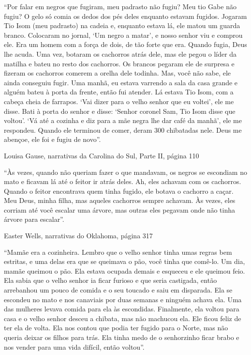 ``Por falar em negros que fugiram, meu padrasto não fugiu? Meu tio Gabe
não fugiu? O gelo só comia os dedos dos pés deles enquanto estavam
fugidos. Jogaram Tio Isom (meu padrasto) na cadeia e, enquanto estava
lá, ele matou um guarda branco. Colocaram no jornal, `Um negro a matar',
e nosso senhor viu e comprou ele. Era um homem com a força de dois, de
tão forte que era. Quando fugia, Deus lhe acuda. Uma vez, botaram os
cachorros atrás dele, mas ele pegou o líder da matilha e bateu no resto
dos cachorros. Os brancos pegaram ele de surpresa e fizeram os cachorros
comerem a orelha dele todinha. Mas, você não sabe, ele ainda conseguiu
fugir. Uma manhã, eu estava varrendo a sala da casa grande e alguém
bateu à porta da frente, então fui atender. Lá estava Tio Isom, com a
cabeça cheia de farrapos. `Vai dizer para o velho senhor que eu voltei',
ele me disse. Bati à porta do senhor e disse: `Senhor coronel Sam, Tio
Isom disse que voltou'. `Vá até a cozinha e diz para a mãe negra lhe dar
café da manhã', ele me respondeu. Quando ele terminou de comer, deram
300 chibatadas nele. Deus me abençoe, ele foi e fugiu de novo''.

Louisa Gause, narrativas da Carolina do Sul, Parte II, página 110

``Às vezes, quando não queriam fazer o que mandavam, os negros se
escondiam no mato e ficavam lá até o feitor ir atrás deles. Ah, eles
achavam com os cachorros. Quando o feitor encontrava quem tinha fugido,
ele botava o cachorro a caçar. Meu Deus, minha filha, mas aqueles
cachorros sempre achavam. Às vezes, eles corriam até você escalar uma
árvore, mas outras eles pegavam onde não tinha árvore para escalar''.

Easter Wells, narrativas do Oklahoma, página 317

``Mamãe era a cozinheira. Lembro que o velho senhor tinha umas regras
bem estritas, e uma delas era que se queimava o pão, você tinha que
comê-lo. Um dia, mamãe queimou o pão. Ela estava ocupada demais e
esqueceu e ele queimou feio. Ela sabia que o velho senhor ia ficar
furioso e que seria castigada, então arrebanhou um pouco de comida e o
seu toucado e saiu em disparada. Ela se escondeu no mato e nos canaviais
por duas semanas e ninguém achava ela. Uma das mulheres levava comida
para ela às escondidas. Finalmente, ela voltou para casa e o velho
senhor desceu a chibata, mas não machucou ela. Ele ficou feliz de ter
ela de volta. Ela nos contou que podia ter fugido para o Norte, mas não
queria deixar os filhos para trás. Ela tinha medo de o senhorzinho ficar
brabo e nos vender para uma vida difícil, então voltou''.

